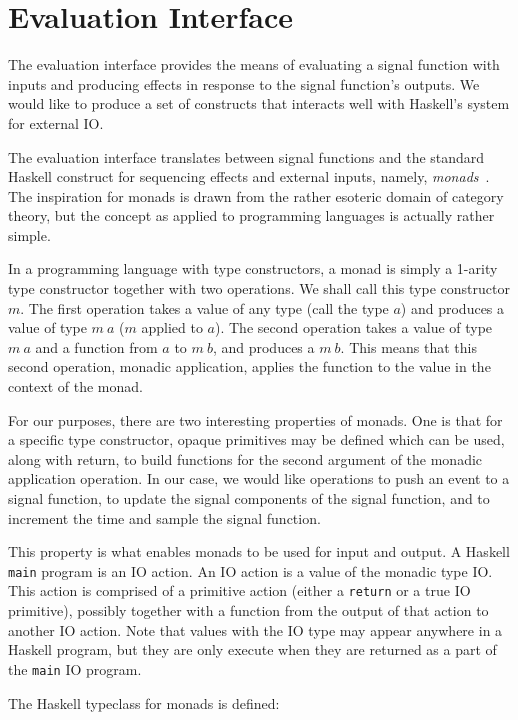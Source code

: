 \section{Evaluation Interface}
\label{section:Implementation-Evaluation_Interface}
The evaluation interface provides the means of evaluating a signal function
with inputs and producing effects in response to the signal function's outputs.
We would like to produce a set of constructs that interacts well with Haskell's
system for external IO.

The evaluation interface translates between signal functions and the standard
Haskell construct for sequencing effects and external inputs, namely,
{\em monads}~\cite{PeytonJones1993}. The inspiration for monads is drawn from
the rather esoteric domain of category theory, but the concept as applied to
programming languages is actually rather simple.

In a programming language with type constructors, a monad is simply a 1-arity
type constructor together with two operations. We shall call this type
constructor $m$. The first operation takes a value of any type
(call the type $a$) and produces a value of type $m \: a$ ($m$ applied to $a$).
The second operation takes a value of type $m \: a$ and a function from $a$ to
$m \: b$, and produces a $m \: b$. This means that this second operation,
monadic application, applies the function to the value in the context of the
monad.

For our purposes, there are two interesting properties of monads. One is that
for a specific type constructor, opaque primitives may be defined which
can be used, along with return, to build functions for the second argument
of the monadic application operation. In our case, we would like operations
to push an event to a signal function, to update the signal components of
the signal function, and to increment the time and sample the signal function.

This property is what enables monads to be used for input and output. A Haskell
{\tt main} program is an IO action. An IO action is a value of the monadic type
IO. This action is comprised of a primitive action (either a {\tt return} or a 
true IO primitive), possibly together with a function from the output of that
action to another IO action. Note that values with the IO type may appear
anywhere in a Haskell program, but they are only execute when they are returned
as a part of the {\tt main} IO program.

The Haskell typeclass for monads is defined:

